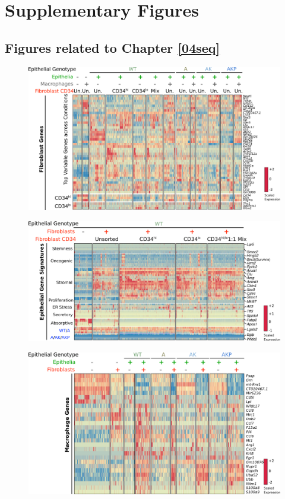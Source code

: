 \chapter{Supplementary Figures}
\label{appendix:SupFig}

\section{Figures related to Chapter \ref{04seq}}

\begin{figure}[h!]
    \centering
    \includegraphics{0Xappendices/0XSup_DEfib.png}
    \caption{}
    \label{sfig:defib}
\end{figure}

\begin{figure}[h!]
    \centering
    \includegraphics{0Xappendices/0XSup_DEepibyfib.png}
    \caption{}
    \label{sfig:deepibyfib}
\end{figure}

\begin{figure}[h!]
    \centering
    \includegraphics{0Xappendices/0XSup_DEmac.png}
    \caption{}
    \label{sfig:demac}
\end{figure}

